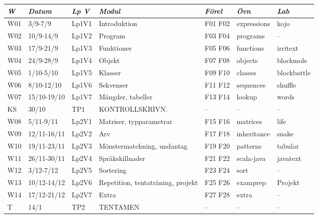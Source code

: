 \begin{tabular}{l|l|l|l|l|l|l}
\textit{W} & \textit{Datum} & \textit{Lp V} & \textit{Modul} & \textit{Förel} & \textit{Övn} & \textit{Lab} \\ \hline \hline
W01 & 3/9-7/9 & Lp1V1 & Introduktion & F01 F02 & expressions & kojo \\
W02 & 10/9-14/9 & Lp1V2 & Program & F03 F04 & programs & -- \\
W03 & 17/9-21/9 & Lp1V3 & Funktioner & F05 F06 & functions & irritext \\
W04 & 24/9-28/9 & Lp1V4 & Objekt & F07 F08 & objects & blockmole \\
W05 & 1/10-5/10 & Lp1V5 & Klasser & F09 F10 & classes & blockbattle \\
W06 & 8/10-12/10 & Lp1V6 & Sekvenser & F11 F12 & sequences & shuffle \\
W07 & 15/10-19/10 & Lp1V7 & Mängder, tabeller & F13 F14 & lookup & words \\
KS & 30/10 & TP1 & KONTROLLSKRIVN. & -- & -- & -- \\
W08 & 5/11-9/11 & Lp2V1 & Matriser, typparametrar & F15 F16 & matrices & life \\
W09 & 12/11-16/11 & Lp2V2 & Arv & F17 F18 & inheritance & snake \\
W10 & 19/11-23/11 & Lp2V3 & Mönstermatchning, undantag & F19 F20 & patterns & tabular \\
W11 & 26/11-30/11 & Lp2V4 & Språkskillnader & F21 F22 & scala-java & javatext \\
W12 & 3/12-7/12 & Lp2V5 & Sortering & F23 F24 & sort & -- \\
W13 & 10/12-14/12 & Lp2V6 & Repetition, tentaträning, projekt & F25 F26 & examprep & Projekt \\
W14 & 17/12-21/12 & Lp2V7 & Extra & F27 F28 & extra & -- \\
T & 14/1 & TP2 & TENTAMEN & -- & -- & -- \\
\end{tabular}
